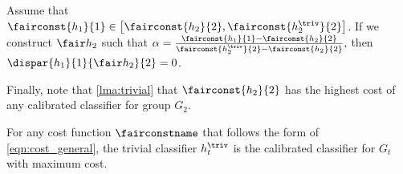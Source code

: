 %
\begin{corollary}
  \label{crly:exists_equal_cost}
  Assume that $\fairconst{h_1}{1} \in \left[ \fairconst{h_2}{2}, \fairconst{h^\triv_2}{2} \right]$.
  If we construct $\fair h_2$ such that
  $
    \alpha = \frac{\fairconst{h_1}{1} - \fairconst{h_2}{2}}{\fairconst{h^\triv_2}{2} - \fairconst{h_2}{2}},
  $
  then $\dispar{h_1}{1}{\fair h_2}{2} = 0$.
\end{corollary}
%
Finally, note that \autoref{lma:trivial} that $\fairconst{h_2}{2}$ has the highest cost of any
calibrated classifier for group $G_2$.
%
\begin{lemma}
  For any cost function $\fairconstname$ that follows the form of
  \eqref{eqn:cost_general}, the trivial classifier $h^\triv_t$ is the calibrated
  classifier for $G_t$ with maximum cost.
  \label{lma:trivial}
\end{lemma}
%
